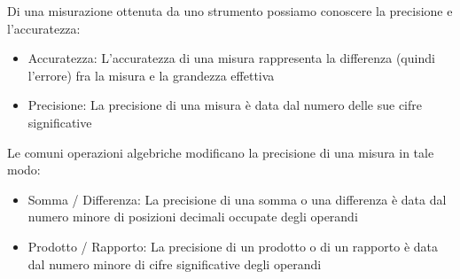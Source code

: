 \documentclass[a4paper,12pt]{article}
\begin{document}
Di una misurazione ottenuta da uno strumento possiamo conoscere la precisione e l'accuratezza:
\begin{itemize}
  \item Accuratezza:
    L'accuratezza di una misura rappresenta la differenza (quindi l'errore) fra la misura e la grandezza effettiva
  \item Precisione:
    La precisione di una misura è data dal numero delle sue cifre significative 
\end{itemize}

Le comuni operazioni algebriche modificano la precisione di una misura in tale modo:
    \begin{itemize}
      \item Somma / Differenza:
        La precisione di una somma o una differenza è data dal numero minore di posizioni decimali occupate degli operandi
      \item Prodotto / Rapporto:
        La precisione di un prodotto o di un rapporto è data dal numero minore di cifre significative degli operandi
    \end{itemize}
\end{document}
